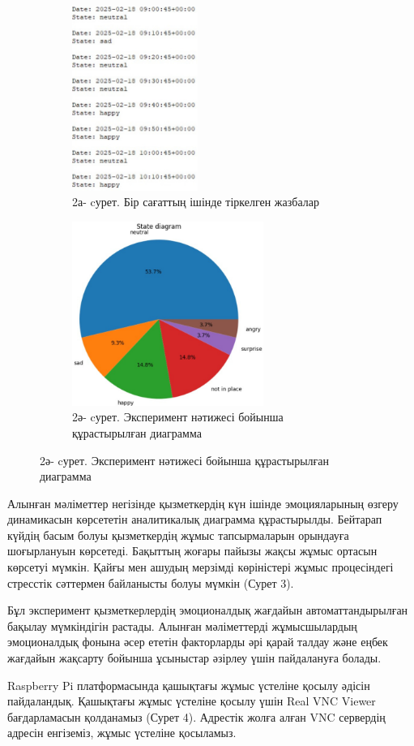 \begin{figure}[H]
	\centering
	\begin{subfigure}{0.48\textwidth}
		\centering
		\includegraphics[width=\textwidth, height=6cm, keepaspectratio]{media/ict2/image158}
		\caption*{2а- cурет. Бір сағаттың ішінде тіркелген жазбалар}
	\end{subfigure}
	\begin{subfigure}{0.48\textwidth}
		\centering
		\includegraphics[width=\textwidth, height=6cm, keepaspectratio]{media/ict2/image159}
		\caption*{2ә- cурет. Эксперимент нәтижесі бойынша құрастырылған диаграмма}
	\end{subfigure}
\end{figure}

\begin{multicols}{2}
Алынған мәліметтер негізінде қызметкердің күн ішінде эмоцияларының
өзгеру динамикасын көрсететін аналитикалық диаграмма құрастырылды.
Бейтарап күйдің басым болуы қызметкердің жұмыс тапсырмаларын орындауға
шоғырлануын көрсетеді. Бақыттың жоғары пайызы жақсы жұмыс ортасын
көрсетуі мүмкін. Қайғы мен ашудың мерзімді көріністері жұмыс
процесіндегі стресстік сәттермен байланысты болуы мүмкін (Сурет 3).

Бұл эксперимент қызметкерлердің эмоционалдық жағдайын автоматтандырылған
бақылау мүмкіндігін растады. Алынған мәліметтерді жұмысшылардың
эмоционалдық фонына әсер ететін факторларды әрі қарай талдау және еңбек
жағдайын жақсарту бойынша ұсыныстар әзірлеу үшін пайдалануға болады.

Raspberry Pi платформасында қашықтағы жұмыс үстеліне қосылу әдісін
пайдаландық. Қашықтағы жұмыс үстеліне қосылу үшін Real VNC Viewer
бағдарламасын қолданамыз (Сурет 4). Адрестік жолға алған VNC сервердің
адресін енгіземіз, жұмыс үстеліне қосыламыз.

\end{multicols}

